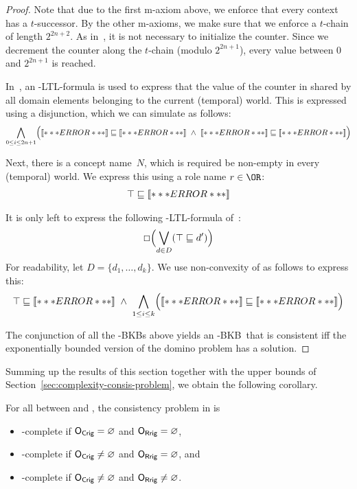 \begin{proof}
  Note that due to the first m-axiom above, we enforce that every context has a $t$-successor.  By
  the other m-axioms, we make sure that we enforce a $t$-chain of length $2^{2n+2}$.
  As in~\cite{BaGL-KR08,BaGL-ToCL12}, it is not necessary to initialize the counter.  Since we
  decrement the counter along the $t$-chain (modulo $2^{2n+1}$), every value between $0$ and
  $2^{2n+1}$ is reached.

  In~\cite{BaGL-KR08,BaGL-ToCL12}, an \ALC-LTL-formula is used to express that the value of the
  counter in shared by all domain elements belonging to the current (temporal) world.  This is
  expressed using a disjunction, which we can simulate as follows:
  \begin{gather*}
    \bigwedge_{0\le i\le 2n+1} \Bigl(\oax{Z_i(a)}\sqsubseteq\oax{\top\sqsubseteq Z_i}\ \land\
    \oax{(\lnot Z_i)(a)}\sqsubseteq\oax{Z_i\sqsubseteq\bot}\Bigr)
  \end{gather*}

  Next, there is a concept name~$N$, which is required be non-empty in every (temporal) world.  We
  express this using a role name $r\in\OR$:
  \begin{gather*}
    \top\sqsubseteq\oax{(\exists r.N)(a)}
  \end{gather*}

  It is only left to express the following \ALC-LTL-formula of~\cite{BaGL-KR08,BaGL-ToCL12}:
  \begin{gather*}
    \Box\Bigl(\bigvee_{d\in D} (\top\sqsubseteq d')\Bigr)
  \end{gather*}
  For readability, let $D=\{d_1,\dots,d_k\}$.  We use non-convexity of \ALC as follows to express
  this:
  \begin{gather*}
    \top\sqsubseteq\oax{(d_1'\sqcup\dots\sqcup d_k')(a)}\ \land\ \bigwedge_{1\le i\le k}
    \Bigl(\oax{d_i'(a)}\sqsubseteq\oax{\top\sqsubseteq d_i'}\Bigr)
  \end{gather*}

  The conjunction of all the \ELALC-BKBs above yields an \ELALC-BKB~\B that is consistent iff the
  exponentially bounded version of the domino problem has a solution.
\end{proof}

Summing up the results of this section together with the upper bounds of
Section~\ref{sec:complexity-consis-problem}, we obtain the following corollary.

\begin{corollary}
  For all \LO between \ALC and \SHOQ, the consistency problem in \ELLO is
  \begin{itemize}
  \item \ExpTime-complete if $\OCR=\emptyset$ and $\ORR=\emptyset$,
  \item \NExpTime-complete if $\OCR\ne\emptyset$ and $\ORR=\emptyset$, and
  \item \TwoExpTime-complete if $\OCR\ne\emptyset$ and $\ORR\ne\emptyset$.
  \end{itemize}
\end{corollary}

